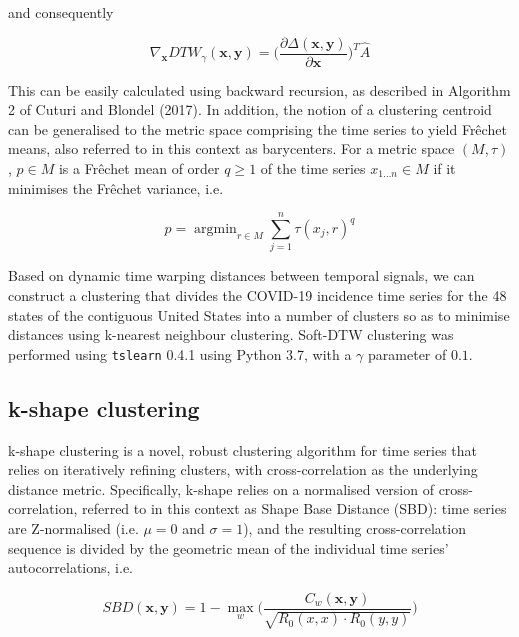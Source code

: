 \documentclass{article}
\begin{document}
\noindent and consequently

\begin{equation}
	\nabla_{\mathbf{x}} DTW_{\gamma} (\mathbf{x}, \mathbf{y}) = \Bigg( \frac{\partial \Delta(\mathbf{x}, \mathbf{y})}{\partial \mathbf{x}} \Bigg)^T \hat{A}
\end{equation}

This can be easily calculated using backward recursion, as described in Algorithm 2 of Cuturi and Blondel (2017).\cite{cuturi2017soft} In addition, the notion of a clustering centroid can be generalised to the metric space comprising the time series to yield Fr\^{e}chet means, also referred to in this context as barycenters. For a metric space $(M, \tau)$, $p \in M$ is a Fr\^{e}chet mean of order $q \geq 1$ of the time series $x_{1 \ldots n} \in M$ if it minimises the Fr\^{e}chet variance, i.e.

\begin{equation}
	p = \mathop{arg min}_{r \in M} \sum_{j = 1}^n \tau(x_j, r)^q
\end{equation}

Based on dynamic time warping distances between temporal signals, we can construct a clustering that divides the COVID-19 incidence time series for the 48 states of the contiguous United States into a number of clusters so as to minimise distances using k-nearest neighbour clustering. Soft-DTW clustering was performed using \texttt{tslearn} 0.4.1\cite{JMLR:v21:20-091} using Python 3.7, with a $\gamma$ parameter of $0.1$.


\subsection{k-shape clustering} %
\label{sub:k_shape_clustering}

k-shape clustering is a novel, robust clustering algorithm for time series that relies on iteratively refining clusters, with cross-correlation as the underlying distance metric.\cite{paparrizos2015k} Specifically, k-shape relies on a normalised version of cross-correlation, referred to in this context as Shape Base Distance (SBD): time series are Z-normalised (i.e. $\mu = 0$ and $\sigma = 1$), and the resulting cross-correlation sequence is divided by the geometric mean of the individual time series' autocorrelations, i.e.

\begin{equation}
	SBD(\mathbf{x}, \mathbf{y}) = 1 - \max_w \Bigg( \frac{C_w(\mathbf{x}, \mathbf{y})}{\sqrt{R_0(x, x) \cdot R_0(y, y)}} \Bigg)
\end{equation}
\end{document}

